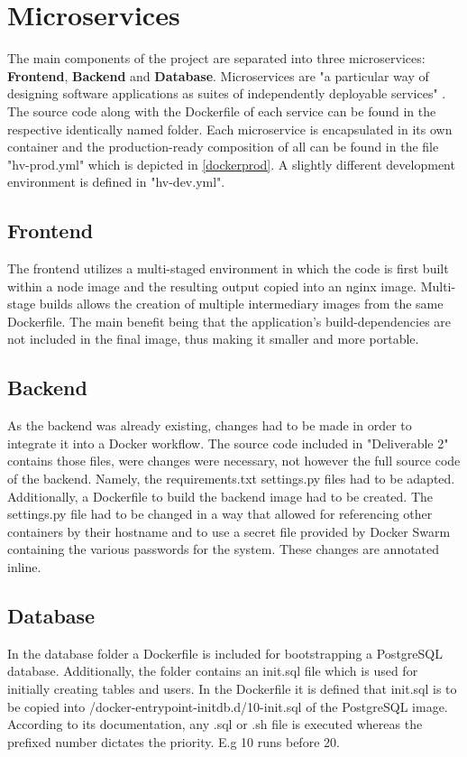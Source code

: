 \section{Microservices}
The main components of the project are separated into three microservices: \textbf{Frontend}, \textbf{Backend} and \textbf{Database}. Microservices are "a particular way of designing software applications as suites of independently deployable services" \cite{MicroservicesFowler:online}. The source code along with the Dockerfile of each service can be found in the respective identically named folder. Each microservice is encapsulated in its own container and the production-ready composition of all can be found in the file "hv-prod.yml" which is depicted in \autoref{dockerprod}. A slightly different development environment is defined in "hv-dev.yml".

\subsection{Frontend}
The frontend utilizes a multi-staged environment in which the code is first built within a node image and the resulting output copied into an nginx image. Multi-stage builds allows the creation of multiple intermediary images from the same Dockerfile. The main benefit being that the application's build-dependencies are not included in the final image, thus making it smaller and more portable. 

\subsection{Backend}
As the backend was already existing, changes had to be made in order to integrate it into a Docker workflow. The source code included in "Deliverable 2" contains those files, were changes were necessary, not however the full source code of the backend. Namely, the requirements.txt settings.py files had to be adapted. Additionally, a Dockerfile to build the backend image had to be created. The settings.py file had to be changed in a way that allowed for referencing other containers by their hostname and to use a secret file provided by Docker Swarm containing the various passwords for the system. These changes are annotated inline.

\subsection{Database}
In the database folder a Dockerfile is included for bootstrapping a PostgreSQL database. Additionally, the folder contains an init.sql file which is used for initially creating tables and users. In the Dockerfile it is defined that init.sql is to be copied into /docker-entrypoint-initdb.d/10-init.sql of the PostgreSQL image. According to its documentation, any .sql or .sh file is executed whereas the prefixed number dictates the priority. E.g 10 runs before 20.

